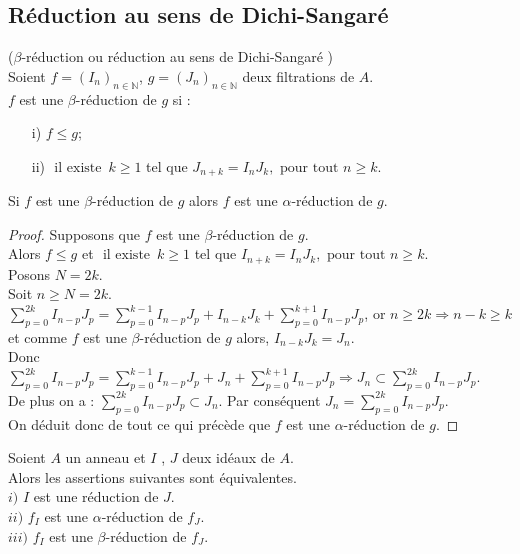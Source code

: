 \subsection{Réduction au sens de Dichi-Sangaré}
\begin{madefinition}
	($\beta$-réduction ou réduction au sens de Dichi-Sangaré \cite{Di4})\\
	Soient $f = (I_n)_{n \in \mathbb{N}}$, $g = (J_n)_{n \in \mathbb{N}}$ deux filtrations de $A$.\\
	$f$ est une $\beta$-réduction de $g$ si : \\
	\begin{enumerate}
		\item[i)] $f \leq g$;
		\item[ii)]  $\text{ il existe } \, k \geq 1$ tel que $J_{n+k} = I_n J_k , \text{ pour tout } n \geq k$.
	\end{enumerate}
\end{madefinition}
\begin{maremarque}
	Si $f$ est une $\beta$-réduction de $g$ alors $f$ est une $\alpha$-réduction de $g$.\\	
\end{maremarque}
\begin{proof}
	Supposons que $f$ est une $\beta$-réduction de $g$.\\
	Alors $f \leq g$ et $\text{ il existe } \, k \geq 1$ tel que $I_{n+k} = I_n J_k , \text{ pour tout } n \geq k$.\\
	Posons $N = 2k$.\\
	Soit $n \geq N= 2k$.\\
	$\displaystyle \sum_{p=0}^{2k}{I_{n-p} J_{p}} = \displaystyle \sum_{p=0}^{k-1}{I_{n-p} J_{p}} + I_{n-k} J_k + \displaystyle \sum_{p=0}^{k+1}{I_{n-p} J_{p}}$, or $n \geq  2k \Rightarrow n-k \geq k$ et comme $f$ est une $\beta$-réduction de $g$ alors, $I_{n-k} J_k = J_n$.\\
	Donc $\displaystyle \sum_{p=0}^{2k}{I_{n-p} J_{p}} = \displaystyle \sum_{p=0}^{k-1}{I_{n-p} J_{p}} + J_n + \displaystyle \sum_{p=0}^{k+1}{I_{n-p} J_{p}} \Rightarrow J_n \subset \displaystyle \sum_{p=0}^{2k}{I_{n-p} J_{p}}$.\\
	De plus on a : $\displaystyle \sum_{p=0}^{2k}{I_{n-p} J_{p}} \subset J_n$. 
	Par conséquent $J_n = \displaystyle \sum_{p=0}^{2k}{I_{n-p} J_{p}}$.\\
	On déduit donc de tout ce qui précède que $f$ est une $\alpha$-réduction de $g$.
\end{proof}
\begin{maproposition}
	Soient $A$ un anneau et $I$ , $J$ deux idéaux de $A$.\\
	Alors les assertions suivantes sont équivalentes.\\
	$i)$ $I$ est une réduction de $J$.\\
	$ii)$ $f_I$ est une $\alpha$-réduction de $f_J$.\\
	$iii)$ $f_I$ est une $\beta$-réduction de $f_J$.
\end{maproposition}
